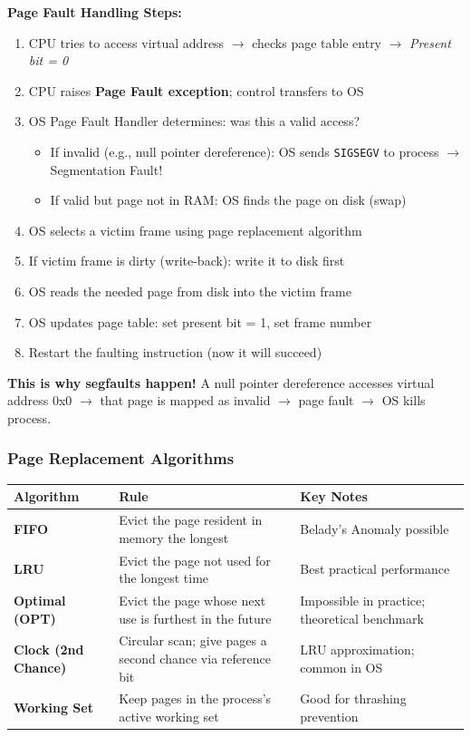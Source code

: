 \documentclass[11pt,a4paper]{article}
\newcommand{\code}[1]{\texttt{\small\colorbox{codebg}{\color{codekw}#1}}}
\newcommand{\term}[1]{\textbf{\color{darkblue}#1}}
\begin{document}
\textbf{Page Fault Handling Steps:}
\begin{enumerate}[noitemsep]
  \item CPU tries to access virtual address $\to$ checks page table entry $\to$ \textit{Present bit = 0}
  \item CPU raises \textbf{Page Fault exception}; control transfers to OS
  \item OS Page Fault Handler determines: was this a valid access?
  \begin{itemize}[noitemsep]
    \item If invalid (e.g., null pointer dereference): OS sends \code{SIGSEGV} to process $\to$ Segmentation Fault!
    \item If valid but page not in RAM: OS finds the page on disk (swap)
  \end{itemize}
  \item OS selects a victim frame using page replacement algorithm
  \item If victim frame is dirty (write-back): write it to disk first
  \item OS reads the needed page from disk into the victim frame
  \item OS updates page table: set present bit = 1, set frame number
  \item Restart the faulting instruction (now it will succeed)
\end{enumerate}

\textbf{This is why segfaults happen!} A null pointer dereference accesses virtual address 0x0 $\to$ that page is mapped as invalid $\to$ page fault $\to$ OS kills process.

\subsubsection{Page Replacement Algorithms}

\begin{center}
\begin{tabular}{L{3.5cm} L{6cm} L{4cm}}
\toprule
\textbf{Algorithm} & \textbf{Rule} & \textbf{Key Notes} \\
\midrule
\term{FIFO} & Evict the page resident in memory the longest & Belady's Anomaly possible \\[4pt]
\term{LRU} & Evict the page not used for the longest time & Best practical performance \\[4pt]
\term{Optimal (OPT)} & Evict the page whose next use is furthest in the future & Impossible in practice; theoretical benchmark \\[4pt]
\term{Clock (2nd Chance)} & Circular scan; give pages a second chance via reference bit & LRU approximation; common in OS \\[4pt]
\term{Working Set} & Keep pages in the process's active working set & Good for thrashing prevention \\
\bottomrule
\end{tabular}
\end{center}
\end{document}

